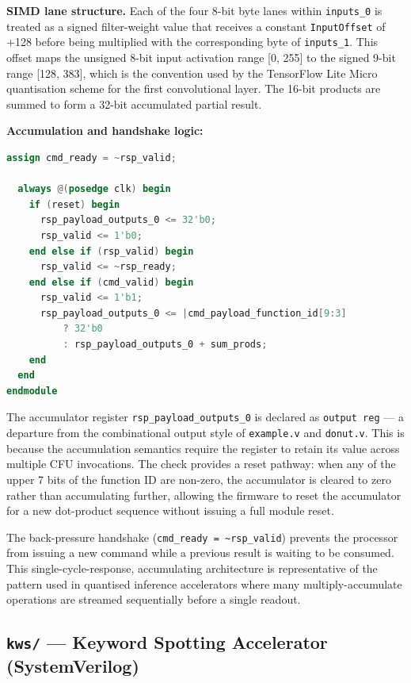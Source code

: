 \textbf{SIMD lane structure.} Each of the four 8-bit byte lanes within \texttt{inputs\_0} is treated as a signed filter-weight value that receives a constant \texttt{InputOffset} of +128 before being multiplied with the corresponding byte of \texttt{inputs\_1}. This offset maps the unsigned 8-bit input activation range [0, 255] to the signed 9-bit range [128, 383], which is the convention used by the TensorFlow Lite Micro quantisation scheme for the first convolutional layer. The 16-bit products are summed to form a 32-bit accumulated partial result.

\textbf{Accumulation and handshake logic:}

\begin{lstlisting}[style=mystyle, language=Verilog]
  assign cmd_ready = ~rsp_valid;

  always @(posedge clk) begin
    if (reset) begin
      rsp_payload_outputs_0 <= 32'b0;
      rsp_valid <= 1'b0;
    end else if (rsp_valid) begin
      rsp_valid <= ~rsp_ready;
    end else if (cmd_valid) begin
      rsp_valid <= 1'b1;
      rsp_payload_outputs_0 <= |cmd_payload_function_id[9:3]
          ? 32'b0
          : rsp_payload_outputs_0 + sum_prods;
    end
  end
endmodule
\end{lstlisting}

The accumulator register \texttt{rsp\_payload\_outputs\_0} is declared as \texttt{output reg} — a departure from the combinational output style of \texttt{example.v} and \texttt{donut.v}. This is because the accumulation semantics require the register to retain its value across multiple CFU invocations. The  check provides a reset pathway: when any of the upper 7 bits of the function ID are non-zero, the accumulator is cleared to zero rather than accumulating further, allowing the firmware to reset the accumulator for a new dot-product sequence without issuing a full module reset.

The back-pressure handshake (\texttt{cmd\_ready = \textasciitilde{}rsp\_valid}) prevents the processor from issuing a new command while a previous result is waiting to be consumed. This single-cycle-response, accumulating architecture is representative of the pattern used in quantised inference accelerators where many multiply-accumulate operations are streamed sequentially before a single readout.

\subsection{\texttt{kws/} — Keyword Spotting Accelerator (SystemVerilog)}

